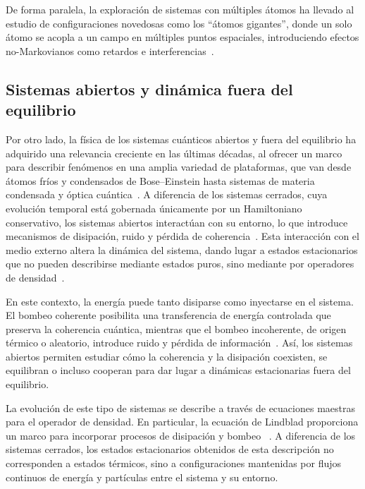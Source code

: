 \documentclass[onecolumn,notitlepage,letterpaper,aps,pra,12pt]{article}
\numberwithin{equation}{section}
\begin{document}
De forma paralela, la exploración de sistemas con múltiples átomos ha llevado al estudio de configuraciones novedosas como los ``átomos gigantes'', donde un solo átomo se acopla a un campo en múltiples puntos espaciales, introduciendo efectos no-Markovianos como retardos e interferencias~\cite{Andersson2019,gonzalez2021-2,cai2021,yu2025}.


\subsection{Sistemas abiertos y dinámica fuera del equilibrio}

Por otro lado, la física de los sistemas cuánticos abiertos y fuera del equilibrio ha adquirido una relevancia creciente en las últimas décadas, al ofrecer un marco para describir fenómenos en una amplia variedad de plataformas, que van desde átomos fríos y condensados de Bose–Einstein hasta sistemas de materia condensada y óptica cuántica~\cite{rotter2015}.
A diferencia de los sistemas cerrados, cuya evolución temporal está gobernada únicamente por un Hamiltoniano conservativo, los sistemas abiertos interactúan  con su entorno, lo que introduce mecanismos de disipación, ruido y pérdida de coherencia~\cite{Sieberer2016}. Esta interacción con el medio externo altera la dinámica del sistema, dando lugar a estados estacionarios que no pueden describirse mediante estados puros, sino mediante por operadores de densidad~\cite{breuer2003}.

En este contexto, la energía puede tanto disiparse como inyectarse en el sistema. El bombeo coherente posibilita una transferencia de energía controlada que preserva la coherencia cuántica, mientras que el bombeo incoherente, de origen térmico o aleatorio, introduce ruido y pérdida de información~\cite{carmichael2013}. Así, los sistemas abiertos permiten estudiar cómo la coherencia y la disipación coexisten, se equilibran o incluso cooperan para dar lugar a dinámicas estacionarias fuera del equilibrio.

La evolución de este tipo de sistemas se describe a través de ecuaciones maestras para el operador de densidad. En particular, la ecuación de Lindblad proporciona un marco  para incorporar procesos de disipación y bombeo~\cite{breuer2003,Li2014,Fazio2025} . A diferencia de los sistemas cerrados, los estados estacionarios obtenidos de esta descripción no corresponden a estados térmicos, sino a configuraciones mantenidas por flujos continuos de energía y partículas entre el sistema y su entorno.
\end{document}
